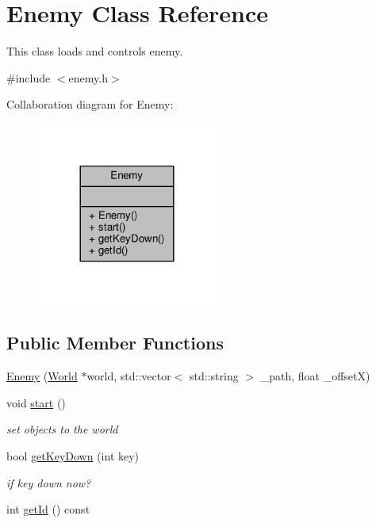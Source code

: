 \hypertarget{classEnemy}{}\section{Enemy Class Reference}
\label{classEnemy}


This class loads and controls enemy.  




{\ttfamily \#include $<$enemy.\+h$>$}



Collaboration diagram for Enemy\+:\nopagebreak
\begin{figure}[H]
\begin{center}
\leavevmode
\includegraphics[width=168pt]{classEnemy__coll__graph}
\end{center}
\end{figure}
\subsection*{Public Member Functions}
\begin{DoxyCompactItemize}
\item 
\hyperlink{classEnemy_a05371b05fdaf447e2811a74e64dd3cf5}{Enemy} (\hyperlink{classWorld}{World} $\ast$world, std\+::vector$<$ std\+::string $>$ \+\_\+path, float \+\_\+offset\+X)
\item 
void \hyperlink{classEnemy_a71641016b8ea6de06deeda6926600da8}{start} ()
\begin{DoxyCompactList}\small\item\em set objects to the world \end{DoxyCompactList}\item 
bool \hyperlink{classEnemy_ac96f56669570d7acf7d53cf21e13b639}{get\+Key\+Down} (int key)
\begin{DoxyCompactList}\small\item\em if key down now? \end{DoxyCompactList}\item 
int \hyperlink{classEnemy_ad24d8afab5f4f150d7bb87ec96baf84d}{get\+Id} () const 
\end{DoxyCompactItemize}



